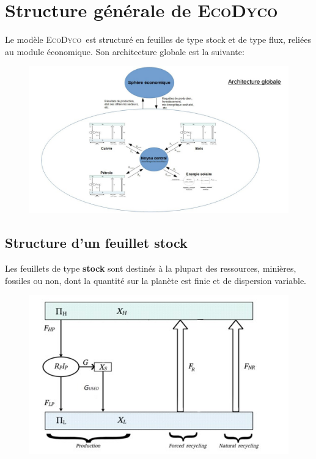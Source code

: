 \documentclass[12pt,a4paper]{article}%
\newcommand{\ed}{\textsc{EcoDyco}}
\begin{document}
\section{Structure générale de \ed}

Le modèle \ed\ est structuré en feuilles de type stock et de type flux,
reliées au module économique. Son architecture globale est la suivante:

\begin{figure}[h]
\centering \includegraphics[width=1.0\textwidth]{figures/Archiglobale.jpg}\end{figure}

\subsection{Structure d'un feuillet stock}

Les feuillets de type \textbf{stock} sont destinés à la plupart des ressources,
minières, fossiles ou non, dont la quantité sur la planète est finie et de dispersion variable.

\begin{figure}[h]
\centering
\includegraphics[width=1.0\textwidth]{figures/FeuilleStock.jpg}\end{figure}
\end{document}

